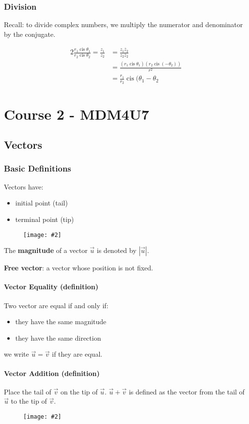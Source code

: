 \documentclass{report}
\newcommand{\diagram}[2][0.5]{
	\begin{figure}[H]
		\centering
		\texttt{[image: \#2]}
	\end{figure}
	}
\DeclareMathOperator\cis{cis}
\theoremstyle{definition}
\numberwithin{equation}{section}
\begin{document}
\subsection{Division}
Recall: to divide complex numbers, we multiply the numerator and denominator by the conjugate.

\begin{alignat*}{2}{}
	\frac{r_1 \cis \theta_1}{r_2 \cis \theta_2} = \frac{z_1}{z_2} &= \frac{z_1 \overline{z}_2}{z_2\overline{z}_2} \\
	&= \frac{(r_1\cis\theta_1)(r_2\cis(-\theta_2))}{r^2} \\
	&= \frac{r_1}{r_2}\cis(\theta_1-\theta_2
\end{alignat*}

\chapter{Course 2 - MDM4U7}

\section{Vectors}
\subsection{Basic Definitions}
Vectors have:
\begin{itemize}
	\item initial point (tail)
	\item terminal point (tip)
\end{itemize}
\diagram[0.6]{vector}
The \textbf{magnitude} of a vector $\vec u$ is denoted by $| \vec u |$.

\bigskip \noindent
\textbf{Free vector}: a vector whose position is not fixed.

\subsubsection{Vector Equality (definition)}
Two vector are equal if and only if:
\begin{itemize}
	\item they have the same magnitude
	\item they have the same direction	
\end{itemize}
we write $\vec u = \vec v$ if they are equal.

\subsubsection{Vector Addition (definition)}
Place the tail of $\vec v$ on the tip of $\vec u$. $\vec u + \vec v$ is defined as the vector from the tail of $\vec u$ to the tip of $\vec v$.
\diagram{vector-add}
\end{document}
